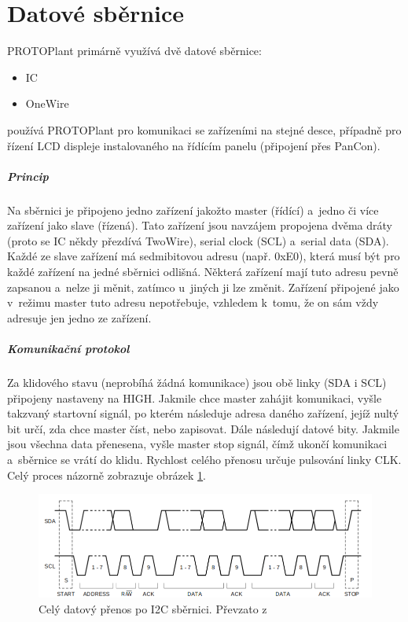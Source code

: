 \section{Datové sběrnice}
PROTOPlant primárně využívá dvě datové sběrnice:
\begin{itemize}
    \item IC
    \item OneWire
\end{itemize}

\noindent{} používá PROTOPlant pro komunikaci se zařízeními na stejné desce, případně pro řízení LCD displeje instalovaného na řídícím panelu (připojení přes PanCon). 
\label{sec:I2C_comm}

\subparagraph{Princip}
Na sběrnici je připojeno jedno zařízení jakožto master (řídící) a~jedno či více zařízení jako slave (řízená).
Tato zařízení jsou navzájem propojena dvěma dráty (proto se IC někdy přezdívá TwoWire), serial clock (SCL) a~serial data (SDA).
Každé ze slave zařízení má sedmibitovou adresu (např. 0xE0), která musí být pro každé zařízení na jedné sběrnici odlišná.
Některá zařízení mají tuto adresu pevně zapsanou a~nelze ji měnit, zatímco u~jiných ji lze změnit.
Zařízení připojené jako v~režimu master tuto adresu nepotřebuje, vzhledem k~tomu, že on sám vždy adresuje jen jedno ze zařízení.

\subparagraph{Komunikační protokol}
Za klidového stavu (neprobíhá žádná komunikace) jsou obě linky (SDA i SCL) připojeny nastaveny na HIGH.
Jakmile chce master zahájit komunikaci, vyšle takzvaný startovní signál, po kterém následuje adresa daného zařízení, jejíž nultý bit určí, zda chce master číst, nebo zapisovat.
Dále následují datové bity.
Jakmile jsou všechna data přene\-se\-na, vyšle master stop signál, čímž ukončí komunikaci a~sběrnice se vrátí do klidu.
Rychlost celého přenosu určuje pulsování linky CLK.
Celý proces názorně zobrazuje obrázek \ref{fig:I2C-protocol}.

\begin{figure}[htbp]
   \centering
   \includegraphics[width=\textwidth]{img/I2C.png}
   \caption{Celý datový přenos po I2C sběrnici. Převzato z~\cite{I2C_specs}}
   \label{fig:I2C-protocol}
\end{figure}

